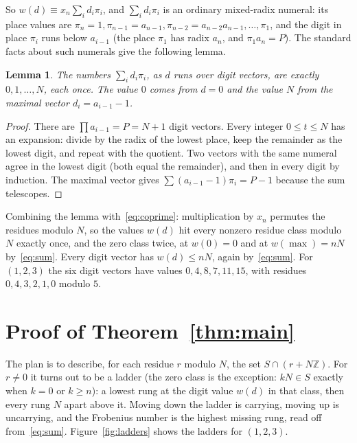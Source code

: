 \documentclass[11pt]{amsart}
\newtheorem{lemma}{Lemma}
\theoremstyle{remark}
\begin{document}
So $w(d)\equiv x_n\sum_id_i\pi_i$, and $\sum_id_i\pi_i$ is an ordinary mixed-radix numeral: its place values are $\pi_n=1,\pi_{n-1}=a_{n-1},\pi_{n-2}=a_{n-2}a_{n-1},\dots,\pi_1$, and the digit in place $\pi_i$ runs below $a_{i-1}$ (the place $\pi_1$ has radix $a_n$, and $\pi_1a_n=P$). The standard facts about such numerals give the following lemma.

\begin{lemma}\label{lem:digits}
The numbers $\sum_id_i\pi_i$, as $d$ runs over digit vectors, are exactly $0,1,\dots,N$, each once. The value $0$ comes from $d=0$ and the value $N$ from the maximal vector $d_i=a_{i-1}-1$.
\end{lemma}

\begin{proof}
There are $\prod a_{i-1}=P=N+1$ digit vectors. Every integer $0\le t\le N$ has an expansion: divide by the radix of the lowest place, keep the remainder as the lowest digit, and repeat with the quotient. Two vectors with the same numeral agree in the lowest digit (both equal the remainder), and then in every digit by induction. The maximal vector gives $\sum(a_{i-1}-1)\pi_i=P-1$ because the sum telescopes.
\end{proof}

Combining the lemma with~\eqref{eq:coprime}: multiplication by $x_n$ permutes the residues modulo $N$, so the values $w(d)$ hit every nonzero residue class modulo $N$ exactly once, and the zero class twice, at $w(0)=0$ and at $w(\max)=nN$ by~\eqref{eq:sum}. Every digit vector has $w(d)\le nN$, again by~\eqref{eq:sum}. For $(1,2,3)$ the six digit vectors have values $0,4,8,7,11,15$, with residues $0,4,3,2,1,0$ modulo $5$.

\section{Proof of Theorem~\ref{thm:main}}

The plan is to describe, for each residue $r$ modulo $N$, the set $S\cap(r+N\mathbb Z)$. For $r\ne0$ it turns out to be a ladder (the zero class is the exception: $kN\in S$ exactly when $k=0$ or $k\ge n$): a lowest rung at the digit value $w(d)$ in that class, then every rung $N$ apart above it. Moving down the ladder is carrying, moving up is uncarrying, and the Frobenius number is the highest missing rung, read off from~\eqref{eq:sum}. Figure~\ref{fig:ladders} shows the ladders for $(1,2,3)$.
\end{document}
